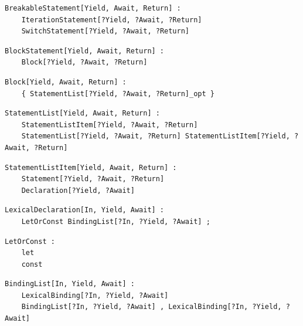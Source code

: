 \noindent\textbf{\texttt{}}\par
\begin{lstlisting}
BreakableStatement[Yield, Await, Return] :
    IterationStatement[?Yield, ?Await, ?Return]
    SwitchStatement[?Yield, ?Await, ?Return]
\end{lstlisting}

\noindent\textbf{\texttt{}}\par
\begin{lstlisting}
BlockStatement[Yield, Await, Return] :
    Block[?Yield, ?Await, ?Return]
\end{lstlisting}

\noindent\textbf{\texttt{}}\par
\begin{lstlisting}
Block[Yield, Await, Return] :
    { StatementList[?Yield, ?Await, ?Return]_opt }
\end{lstlisting}

\noindent\textbf{\texttt{}}\par
\begin{lstlisting}
StatementList[Yield, Await, Return] :
    StatementListItem[?Yield, ?Await, ?Return]
    StatementList[?Yield, ?Await, ?Return] StatementListItem[?Yield, ?Await, ?Return]
\end{lstlisting}

\noindent\textbf{\texttt{}}\par
\begin{lstlisting}
StatementListItem[Yield, Await, Return] :
    Statement[?Yield, ?Await, ?Return]
    Declaration[?Yield, ?Await]
\end{lstlisting}

\noindent\textbf{\texttt{}}\par
\begin{lstlisting}
LexicalDeclaration[In, Yield, Await] :
    LetOrConst BindingList[?In, ?Yield, ?Await] ;
\end{lstlisting}

\noindent\textbf{\texttt{}}\par
\begin{lstlisting}
LetOrConst :
    let
    const
\end{lstlisting}

\noindent\textbf{\texttt{}}\par
\begin{lstlisting}
BindingList[In, Yield, Await] :
    LexicalBinding[?In, ?Yield, ?Await]
    BindingList[?In, ?Yield, ?Await] , LexicalBinding[?In, ?Yield, ?Await]
\end{lstlisting}

